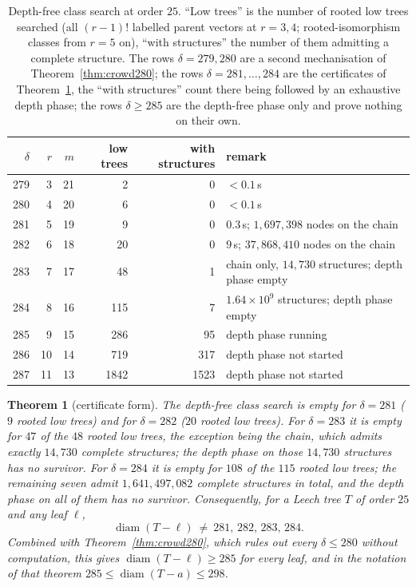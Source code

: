 \documentclass[11pt,a4paper]{article}
\theoremstyle{plain}
\newtheorem{theorem}{Theorem}[section]
\theoremstyle{remark}
\newcommand{\diam}{\operatorname{diam}}
\begin{document}
\begin{table}[ht]
\centering
\caption{Depth-free class search at order $25$.  ``Low trees'' is the number of
rooted low trees searched (all $(r-1)!$ labelled parent vectors at $r=3,4$;
rooted-isomorphism classes from $r=5$ on), ``with structures'' the number of
them admitting a complete structure.  The rows $\delta=279,280$ are a second
mechanisation of Theorem~\ref{thm:crowd280}; the rows $\delta=281,\dots,284$
are the certificates of Theorem~\ref{thm:crowd283}, the ``with structures''
count there being followed by an exhaustive depth phase; the rows
$\delta\ge285$ are the depth-free phase only and prove nothing on their own.}
\label{tab:crowdcert}
\small
\begin{tabular}{@{}rrrrrl@{}}
\toprule
$\delta$ & $r$ & $m$ & low trees & with structures & remark\\
\midrule
279 & 3 & 21 & 2 & 0 & $<0.1$\,s\\
280 & 4 & 20 & 6 & 0 & $<0.1$\,s\\
281 & 5 & 19 & 9 & 0 & $0.3$\,s; $1{,}697{,}398$ nodes on the chain\\
282 & 6 & 18 & 20 & 0 & $9$\,s; $37{,}868{,}410$ nodes on the chain\\
283 & 7 & 17 & 48 & 1 & chain only, $14{,}730$ structures; depth phase empty\\
284 & 8 & 16 & 115 & 7 & $1.64\times10^9$ structures; depth phase empty\\
\midrule
285 & 9 & 15 & 286 & 95 & depth phase running\\
286 & 10 & 14 & 719 & 317 & depth phase not started\\
287 & 11 & 13 & 1842 & 1523 & depth phase not started\\
\bottomrule
\end{tabular}
\end{table}

\begin{theorem}[certificate form]\label{thm:crowd283}
The depth-free class search is empty for $\delta=281$ ($9$ rooted low trees) and
for $\delta=282$ ($20$ rooted low trees).  For $\delta=283$ it is empty for $47$
of the $48$ rooted low trees, the exception being the chain, which admits
exactly $14{,}730$ complete structures; the depth phase on those $14{,}730$
structures has no survivor.  For $\delta=284$ it is empty for $108$ of the $115$
rooted low trees; the remaining seven admit $1{,}641{,}497{,}082$ complete
structures in total, and the depth phase on all of them has no survivor.
Consequently, for a Leech tree $T$ of order $25$ and any leaf $\ell$,
\[
  \diam(T-\ell)\ \ne\ 281,\,282,\,283,\,284 .
\]
Combined with Theorem~\ref{thm:crowd280}, which rules out every
$\delta\le280$ without computation, this gives $\diam(T-\ell)\ge285$ for every
leaf, and in the notation of that theorem $285\le\diam(T-a)\le298$.
\end{theorem}
\end{document}
